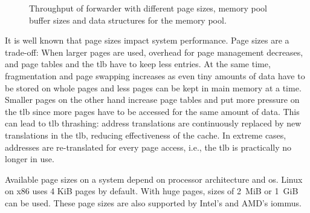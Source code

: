 \begin{figure}[!b]
	\centering
    \par
    \par

    \caption{Throughput of forwarder with different page sizes, memory pool
    buffer sizes and data structures for the memory pool.}
	\label{fig:page-size-throughput}
\end{figure}

It is well known that page sizes impact system performance. Page sizes are a
trade-off: When larger pages are used, overhead for page management decreases,
and page tables and the \ac{tlb} have to keep less entries. At the same time,
fragmentation and page swapping increases as even tiny amounts of data have to
be stored on whole pages and less pages can be kept in main memory at a time.
Smaller pages on the other hand increase page tables and put more pressure on
the \ac{tlb} since more pages have to be accessed for the same amount of data.
This can lead to \ac{tlb} thrashing: address translations are continuously
replaced by new translations in the \ac{tlb}, reducing effectiveness of the
cache. In extreme cases, addresses are re-translated for every page access,
i.e., the \ac{tlb} is practically no longer in use.

Available page sizes on a system depend on processor architecture and \ac{os}.
Linux on x86 uses 4 KiB pages by default. With huge pages, sizes of 2~MiB or
1~GiB can be used. These page sizes are also supported by Intel's and AMD's
\acp{iommu}.

